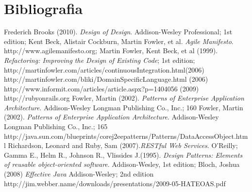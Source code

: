 \section{Bibliografia}

\begin{thebibliography}{12} 

 Frederich Brooks (2010). \textit{Design of Design}. Addison-Wesley Professional; 1st edition;
 Kent Beck, Alistair Cockburn, Martin Fowler, et al. \textit{Agile Manifesto}. http://www.agilemanifesto.org;
 Martin Fowler, Kent Beck, et al (1999). \textit{Refactoring: Improving the Design of Existing Code}; 1st edition;
 http://martinfowler.com/articles/continuousIntegration.html(2006)
 http://martinfowler.com/bliki/DomainSpecificLanguage.html (2006)
 http://www.informit.com/articles/article.aspx?p=1404056 (2009)
 http://rubyonrails.org
 Fowler, Martin (2002). \textit{Patterns of Enterprise Application Architecture}.  Addison-Wesley Longman Publishing Co., Inc.; 160
 Fowler, Martin (2002). \textit{Patterns of Enterprise Application Architecture}.  Addison-Wesley Longman Publishing Co., Inc.; 165
 http://java.sun.com/blueprints/corej2eepatterns/Patterns/DataAccessObject.html
 Richardson, Leonard and Ruby, Sam (2007).\textit{RESTful Web Services}. O'Reilly;
 Gamma E., Helm R., Johnson R., Vlissides J.(1995). \textit{Design Patterns: Elements of reusable object-oriented software}. Addison-Wesley, 1st edition;
 Bloch, Joshua (2008) \textit{Effective Java} Addison-Wesley; 2nd edition
 http://jim.webber.name/downloads/presentations/2009-05-HATEOAS.pdf


\end{thebibliography}
